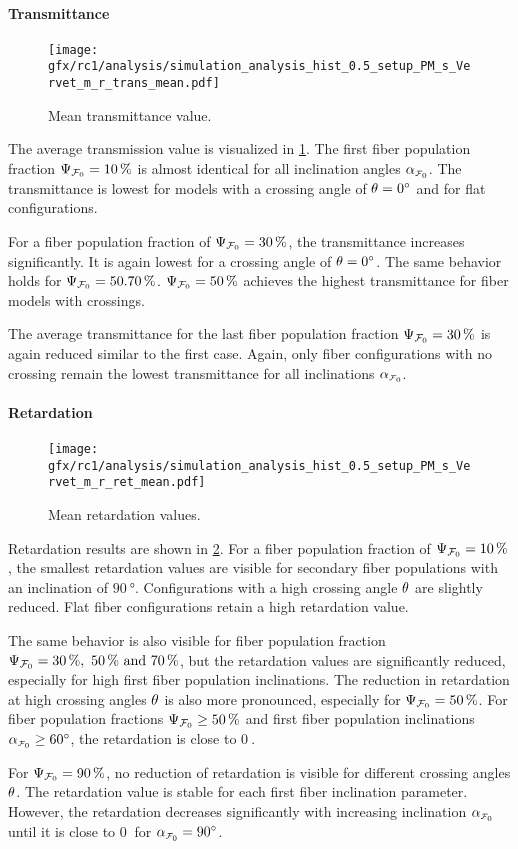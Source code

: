 \paragraph{Transmittance}
% 
\begin{figure}[!p]
\centering
\texttt{[image: gfx/rc1/analysis/simulation\_analysis\_hist\_0.5\_setup\_PM\_s\_Vervet\_m\_r\_trans\_mean.pdf]}
\caption{Mean transmittance value.}
\label{fig:sim_ana_trans}
\end{figure}
% 
The average transmission value is visualized in \cref{fig:sim_ana_trans}.
The first fiber population fraction $\textnormal{$\Psi_{\textnormal{$\mathcal{F}_0$}}$}=\SI{10}{\percent}$ is almost identical for all inclination angles $\modelInc$.
The transmittance is lowest for models with a crossing angle of $\textnormal{$\theta$} = \SI{0}{\degree}$ and for flat configurations.
\par
%
For a fiber population fraction of $\textnormal{$\Psi_{\textnormal{$\mathcal{F}_0$}}$}=\SI{30}{\percent}$, the transmittance increases significantly.
It is again lowest for a crossing angle of $\textnormal{$\theta$}=\SI{0}{\degree}$.
The same behavior holds for $\modelPsi=\SIlist{50,70}{\percent}$.
$\textnormal{$\Psi_{\textnormal{$\mathcal{F}_0$}}$}=\SI{50}{\percent}$ achieves the highest transmittance for fiber models with crossings.
\par
% 
The average transmittance for the last fiber population fraction $\textnormal{$\Psi_{\textnormal{$\mathcal{F}_0$}}$}=\SI{30}{\percent}$ is again reduced similar to the first case.
Again, only fiber configurations with no crossing remain the lowest transmittance for all inclinations $\modelInc$.
%
% 
% 
\paragraph{Retardation}
% 
\begin{figure}[!p]
\centering
\texttt{[image: gfx/rc1/analysis/simulation\_analysis\_hist\_0.5\_setup\_PM\_s\_Vervet\_m\_r\_ret\_mean.pdf]}
\caption{Mean retardation values.}
\label{fig:sim_ana_ret}
\end{figure}
% 
Retardation results are shown in \cref{fig:sim_ana_ret}.
For a fiber population fraction of $\textnormal{$\Psi_{\textnormal{$\mathcal{F}_0$}}$}=\SI{10}{\percent}$, the smallest retardation values are visible for secondary fiber populations with an inclination of $\SI{90}{\degree}$.
Configurations with a high crossing angle $\textnormal{$\theta$}$ are slightly reduced.
Flat fiber configurations retain a high retardation value.
\par
%
The same behavior is also visible for fiber population fraction $\modelPsi=\SIlist{30;50;70}{\percent}$, but the retardation values are significantly reduced, especially for high first fiber population inclinations.
The reduction in retardation at high crossing angles $\textnormal{$\theta$}$ is also more pronounced, especially for $\textnormal{$\Psi_{\textnormal{$\mathcal{F}_0$}}$}=\SI{50}{\percent}$.
For fiber population fractions $\textnormal{$\Psi_{\textnormal{$\mathcal{F}_0$}}$} \geq \SI{50}{\percent}$ and first fiber population inclinations $\modelInc \geq \SI{60}{\degree}$, the retardation is close to $\SI{0}{}$.
\par
%
For $\textnormal{$\Psi_{\textnormal{$\mathcal{F}_0$}}$}=\SI{90}{\percent}$, no reduction of retardation is visible for different crossing angles $\textnormal{$\theta$}$.
The retardation value is stable for each first fiber inclination parameter.
However, the retardation decreases significantly with increasing inclination $\modelInc$ until it is close to $\SI{0}{}$ for $\modelInc=\SI{90}{\degree}$.
% 
% 
% 
